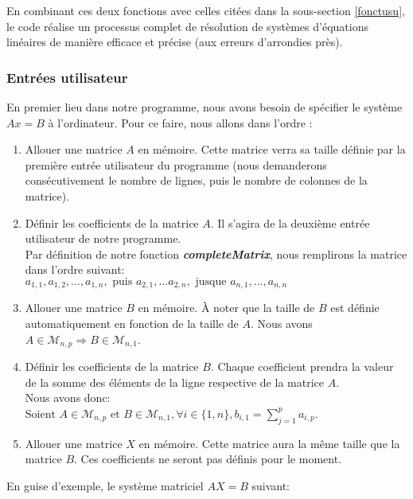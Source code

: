 \documentclass{report}
\begin{document}
En combinant ces deux fonctions avec celles citées dans la sous-section \ref{fonctusu}, le code réalise un processus complet de résolution de systèmes d'équations linéaires de manière efficace et précise (aux erreurs d'arrondies près).\\

\subsubsection{Entrées utilisateur}

En premier lieu dans notre programme, nous avons besoin de spécifier le système $Ax=B$ à l'ordinateur. 
Pour ce faire, nous allons dans l'ordre :
\begin{enumerate}
\item Allouer une matrice $A$ en mémoire. Cette matrice verra sa taille définie par la première entrée utilisateur du programme (nous demanderons consécutivement le nombre de lignes, puis le nombre de colonnes de la matrice).
\item Définir les coefficients de la matrice $A$. Il s'agira de la deuxième entrée utilisateur de notre programme. \\
Par définition de notre fonction \textit{\textbf{completeMatrix}}, nous remplirons la matrice dans l'ordre suivant:\\
$a_{1,1}, a_{1,2}, ..., a_{1,n}, \text{   puis   } a_{2,1}, ... a_{2,n}, \text{   jusque   }  a_{n,1}, ..., a_{n,n}$
\item Allouer une matrice $B$ en mémoire. À noter que la taille de $B$ est définie automatiquement en fonction de la taille de $A$. Nous avons $A\in \mathcal{M}_{n,p} \Rightarrow B\in \mathcal{M}_{n,1}$.
\item Définir les coefficients de la matrice $B$. Chaque coefficient prendra la valeur de la somme des éléments de la ligne respective de la matrice $A$.\\
Nous avons donc:\\ $ \text{Soient } A\in \mathcal{M}_{n,p} \text{ et } B\in \mathcal{M}_{n,1}  , \forall i \in \{1,n\}  , b_{i,1}=\sum_{j=1}^{p} a_{i,p}$.\\
\item Allouer une matrice $X$ en mémoire. Cette matrice aura la même taille que la matrice $B$. Ces coefficients ne seront pas définis pour le moment.
\end{enumerate}

En guise d'exemple, le système matriciel $AX=B$ suivant:
\end{document}
